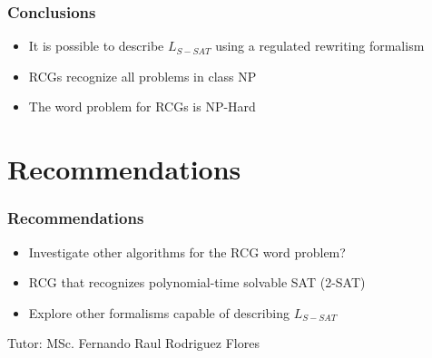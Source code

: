 \documentclass{beamer}
\newcommand{\tutor}{MSc. Fernando Raul Rodriguez Flores} %
\begin{document}
\begin{frame}
    \frametitle{Conclusions}

    \begin{itemize}
        \item It is possible to describe $L_{S-SAT}$ using a regulated rewriting formalism
        \item RCGs recognize all problems in class NP
              \pause
        \item The word problem for RCGs is NP-Hard
    \end{itemize}
\end{frame}

\section{Recommendations}
\begin{frame}
    \frametitle{Recommendations}

    \begin{itemize}
        \item Investigate other algorithms for the RCG word problem?
              \pause
        \item RCG that recognizes polynomial-time solvable SAT (2-SAT)
              \pause
        \item Explore other formalisms capable of describing $L_{S-SAT}$
    \end{itemize}
\end{frame}


\begin{frame}
    \titlepage
    \vspace{1cm} %
    \begin{center}
        Tutor: \tutor
    \end{center}
\end{frame}
\end{document}
